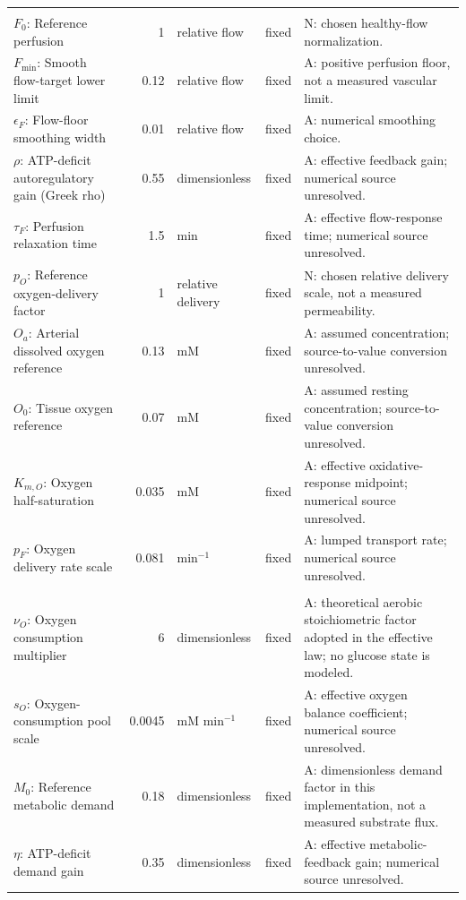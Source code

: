 \begin{longtable}{@{}>{\raggedright\arraybackslash}p{4.4cm}r>{\raggedright\arraybackslash}p{2.0cm}>{\raggedright\arraybackslash}p{1.0cm}>{\raggedright\arraybackslash}p{8.0cm}@{}}
\addlinespace[4pt]\multicolumn{5}{@{}l}{\textbf{Perfusion and oxygen delivery}}\\*
\(F_0\): Reference perfusion & 1 & relative flow & fixed & N: chosen healthy-flow normalization. \\
\(F_{\min}\): Smooth flow-target lower limit & 0.12 & relative flow & fixed & A: positive perfusion floor, not a measured vascular limit. \\
\(\epsilon_F\): Flow-floor smoothing width & 0.01 & relative flow & fixed & A: numerical smoothing choice. \\
\(\rho\): ATP-deficit autoregulatory gain (Greek rho) & 0.55 & dimensionless & fixed & A: effective feedback gain; numerical source unresolved. \\
\(\tau_F\): Perfusion relaxation time & 1.5 & min & fixed & A: effective flow-response time; numerical source unresolved. \\
\(p_O\): Reference oxygen-delivery factor & 1 & relative delivery & fixed & N: chosen relative delivery scale, not a measured permeability. \\
\(O_a\): Arterial dissolved oxygen reference & 0.13 & mM & fixed & A: assumed concentration; source-to-value conversion unresolved. \\
\(O_0\): Tissue oxygen reference & 0.07 & mM & fixed & A: assumed resting concentration; source-to-value conversion unresolved. \\
\(K_{m,O}\): Oxygen half-saturation & 0.035 & mM & fixed & A: effective oxidative-response midpoint; numerical source unresolved. \\
\(p_F\): Oxygen delivery rate scale & 0.081 & min\(^{-1}\) & fixed & A: lumped transport rate; numerical source unresolved. \\
\addlinespace[4pt]\multicolumn{5}{@{}l}{\textbf{Energetics and workload closure}}\\*
\(\nu_O\): Oxygen consumption multiplier & 6 & dimensionless & fixed & A: theoretical aerobic stoichiometric factor adopted in the effective law; no glucose state is modeled. \\
\(s_O\): Oxygen-consumption pool scale & 0.0045 & mM min\(^{-1}\) & fixed & A: effective oxygen balance coefficient; numerical source unresolved. \\
\(M_0\): Reference metabolic demand & 0.18 & dimensionless & fixed & A: dimensionless demand factor in this implementation, not a measured substrate flux. \\
\(\eta\): ATP-deficit demand gain & 0.35 & dimensionless & fixed & A: effective metabolic-feedback gain; numerical source unresolved. \\

\end{longtable}
